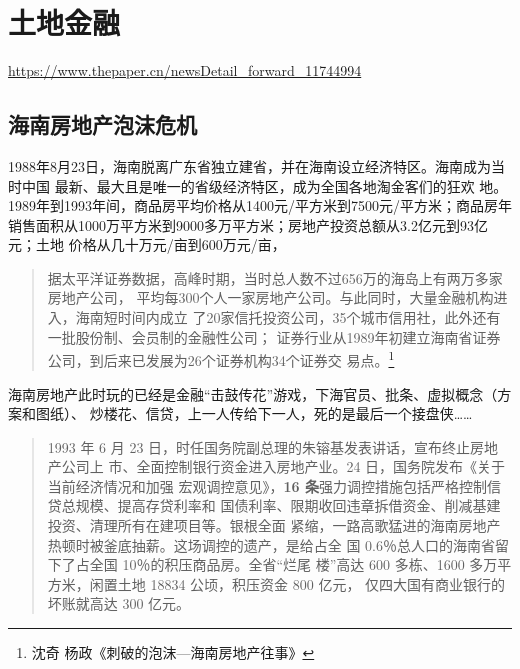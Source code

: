 \section{土地金融}
\label{sec:92tudi}
\url{https://www.thepaper.cn/newsDetail_forward_11744994}




\subsection{海南房地产泡沫危机}
\label{sec:hainan}

1988年8月23日，海南脱离广东省独立建省，并在海南设立经济特区。海南成为当时中国
最新、最大且是唯一的省级经济特区，成为全国各地淘金客们的狂欢
地。1989年到1993年间，商品房平均价格从1400元/平方米到7500元/平方米；商品房年
销售面积从1000万平方米到9000多万平方米；房地产投资总额从3.2亿元到93亿元；土地
价格从几十万元/亩到600万元/亩，


\begin{quotation}
  据太平洋证券数据，高峰时期，当时总人数不过656万的海岛上有两万多家房地产公司，
  平均每300个人一家房地产公司。与此同时，大量金融机构进入，海南短时间内成立
  了20家信托投资公司，35个城市信用社，此外还有一批股份制、会员制的金融性公司；
  证券行业从1989年初建立海南省证券公司，到后来已发展为26个证券机构34个证券交
  易点。\footnote{沈奇 杨政《刺破的泡沫—海南房地产往事》}
\end{quotation}
海南房地产此时玩的已经是金融“击鼓传花”游戏，下海官员、批条、虚拟概念（方案和图纸）、
炒楼花、信贷，上一人传给下一人，死的是最后一个接盘侠……

\begin{quotation}
  1993 年 6 月 23 日，时任国务院副总理的朱镕基发表讲话，宣布终止房地产公司上
  市、全面控制银行资金进入房地产业。24 日，国务院发布《关于当前经济情况和加强
  宏观调控意见》，\textbf{16 条}强力调控措施包括严格控制信贷总规模、提高存贷利率和
  国债利率、限期收回违章拆借资金、削减基建投资、清理所有在建项目等。银根全面
  紧缩，一路高歌猛进的海南房地产热顿时被釜底抽薪。这场调控的遗产，是给占全
  国 0.6％总人口的海南省留下了占全国 10％的积压商品房。全省“烂尾
  楼”高达 600 多栋、1600 多万平方米，闲置土地 18834 公顷，积压资金 800 亿元，
  仅四大国有商业银行的坏账就高达 300 亿元。
\end{quotation}

